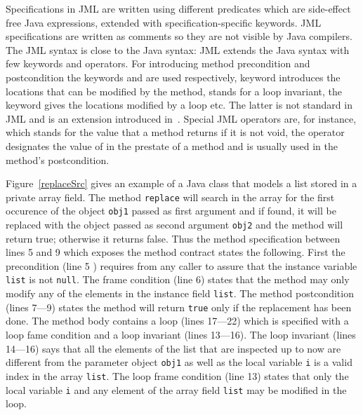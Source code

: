     Specifications in JML are written using different predicates
    which are side-effect free Java expressions, extended with
    specification-specific keywords. JML specifications are written as comments so they are not
    visible by Java compilers. The JML syntax is close to the Java syntax: JML extends the Java
    syntax with few keywords and operators. 
    For introducing method precondition and postcondition the keywords  and  are used  
    respectively,   keyword introduces the locations that can be modified by the method, 
     stands for a loop invariant, the  keyword gives the 
    locations modified by a loop etc. The latter is not standard in JML and is an extension introduced in~\cite{BRL-JACK}.
    Special JML operators are, for instance,  which stands for the value that a method returns if it is not
    void, the  operator 
    designates the value of  in the prestate of a method and is usually
    used in the method's postcondition.


     
Figure~\ref{replaceSrc} gives an example of a Java class that models a list stored in a private array field. 
The method \texttt{replace} will search in the array for the first occurence of the object \texttt{obj1} passed as first argument
 and if found, it will be replaced with the object passed as second argument \texttt{obj2} and the method will return true; otherwise it 
returns false. Thus the method  specification between lines 5 and 9 which exposes the method contract states the following.
First the precondition (line 5 ) requires from any caller to assure that the instance variable \texttt{list} is not \texttt{null}.
The frame condition (line  6) states that the method may only
modify any of the elements in the instance field \texttt{list}. The method postcondition (lines 7---9) states the method will return 
\texttt{true} only if  the replacement has been done.
The method body contains a loop (lines 17---22) which is specified with a loop fame condition and a loop invariant (lines 13---16).
  The loop invariant (lines 14---16) says that all the elements of the list that are inspected up to now are 
different from the parameter object \texttt{obj1} as well as the local variable \texttt{i}  is a valid index in the array \texttt{list}.
The loop frame condition (line 13)  states that only
 the local variable \texttt{i} and any element of the array field \texttt{list} may be modified in the loop.

